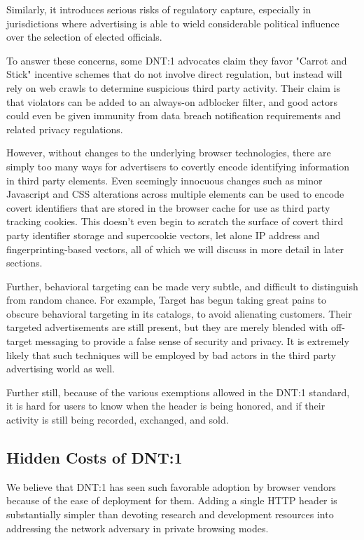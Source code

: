 \documentclass[letterpaper,11pt]{llncs}
\begin{document}
Similarly, it introduces serious risks of regulatory capture, especially in
jurisdictions where advertising is able to wield considerable political
influence over the selection of elected officials.

To answer these concerns, some DNT:1 advocates claim they favor "Carrot and
Stick" incentive schemes that do not involve direct regulation, but instead
will rely on web crawls to determine suspicious third party
activity\cite{fourthparty}. Their claim is that violators can be added to an
always-on adblocker filter, and good actors could even be given immunity from
data breach notification requirements and related privacy regulations.

However, without changes to the underlying browser technologies, there are
simply too many ways for advertisers to covertly encode identifying
information in third party elements. Even seemingly innocuous changes such as
minor Javascript and CSS alterations across multiple elements can be used to
encode covert identifiers that are stored in the browser cache for use as
third party tracking cookies. This doesn't even begin to scratch the surface
of covert third party identifier storage and supercookie vectors, let alone IP
address and fingerprinting-based vectors, all of which we will discuss in more
detail in later sections.

Further, behavioral targeting can be made very subtle, and difficult to
distinguish from random chance. For example, Target has begun taking great
pains to obscure behavioral targeting in its catalogs, to avoid alienating
customers. Their targeted advertisements are still present, but they are
merely blended with off-target messaging to provide a false sense of security
and privacy\cite{target}. It is extremely likely that such techniques will be
employed by bad actors in the third party advertising world as well.
 
Further still, because of the various exemptions allowed in the DNT:1
standard, it is hard for users to know when the header is being honored, and
if their activity is still being recorded, exchanged, and sold.

\subsection{Hidden Costs of DNT:1}

We believe that DNT:1 has seen such favorable adoption by browser vendors
because of the ease of deployment for them. Adding a single HTTP header is
substantially simpler than devoting research and development resources into
addressing the network adversary in private browsing modes.
\end{document}
